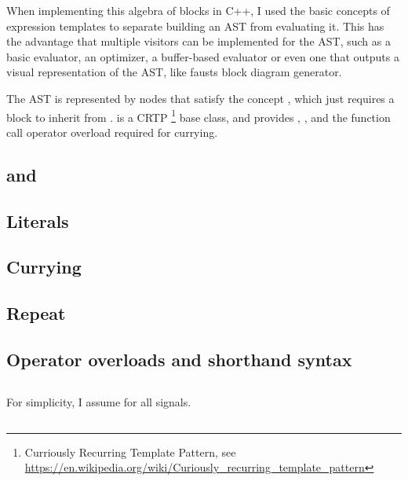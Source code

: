 When implementing this algebra of blocks in C++, I used the basic concepts of expression templates to
separate building an AST from evaluating it. This has the advantage that multiple visitors can be implemented
for the AST, such as a basic evaluator, an optimizer, a buffer-based evaluator or even one that outputs a
visual representation of the AST, like fausts block diagram generator.

The AST is represented by nodes that satisfy the concept , which just requires a block
 to inherit from .  is a CRTP
\footnote{Curriously Recurring Template Pattern, see \url{https://en.wikipedia.org/wiki/Curiously_recurring_template_pattern}} base class, and provides , , and the
function call operator overload required for currying.

\subsection{ and }
\subsection{Literals}
\subsection{Currying}
\subsection{Repeat}
\subsection{Operator overloads and shorthand syntax}

\subsection{}
For simplicity, I assume  for all signals. \subsection{}
